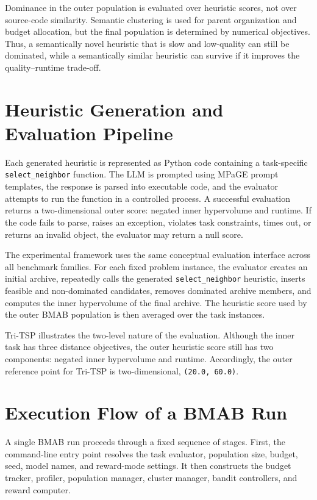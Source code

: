 Dominance in the outer population is evaluated over heuristic scores, not over source-code similarity. Semantic clustering is used for parent organization and budget allocation, but the final population is determined by numerical objectives. Thus, a semantically novel heuristic that is slow and low-quality can still be dominated, while a semantically similar heuristic can survive if it improves the quality--runtime trade-off.

\section{Heuristic Generation and Evaluation Pipeline}

Each generated heuristic is represented as Python code containing a task-specific \texttt{select\_neighbor} function. The LLM is prompted using MPaGE prompt templates, the response is parsed into executable code, and the evaluator attempts to run the function in a controlled process. A successful evaluation returns a two-dimensional outer score: negated inner hypervolume and runtime. If the code fails to parse, raises an exception, violates task constraints, times out, or returns an invalid object, the evaluator may return a null score.

The experimental framework uses the same conceptual evaluation interface across all benchmark families. For each fixed problem instance, the evaluator creates an initial archive, repeatedly calls the generated \texttt{select\_neighbor} heuristic, inserts feasible and non-dominated candidates, removes dominated archive members, and computes the inner hypervolume of the final archive. The heuristic score used by the outer BMAB population is then averaged over the task instances.

Tri-TSP illustrates the two-level nature of the evaluation. Although the inner task has three distance objectives, the outer heuristic score still has two components: negated inner hypervolume and runtime. Accordingly, the outer reference point for Tri-TSP is two-dimensional, \texttt{(20.0, 60.0)}.

\section{Execution Flow of a BMAB Run}

A single BMAB run proceeds through a fixed sequence of stages. First, the command-line entry point resolves the task evaluator, population size, budget, seed, model names, and reward-mode settings. It then constructs the budget tracker, profiler, population manager, cluster manager, bandit controllers, and reward computer.

